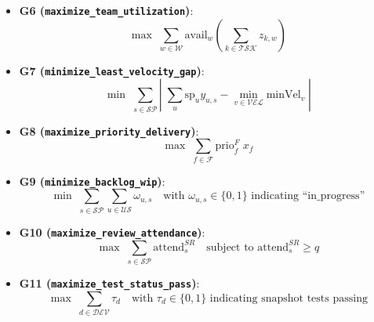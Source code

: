 \documentclass[11pt,a4paper]{article}
\begin{document}
\begin{itemize}[leftmargin=1.2em]
  \item \textbf{G6 (\texttt{maximize\_team\_utilization})}:
  \[
    \max \; \sum_{w \in \mathcal{W}} \mathrm{avail}_w \left(\sum_{k \in \mathcal{TSK}} z_{k,w}\right)
  \]

  \item \textbf{G7 (\texttt{minimize\_least\_velocity\_gap})}:
  \[
    \min \; \sum_{s \in \mathcal{SP}} \left|\; \sum_{u} \mathrm{sp}_u y_{u,s} - \min_{v \in \mathcal{VEL}}\mathrm{minVel}_v \;\right|
  \]

  \item \textbf{G8 (\texttt{maximize\_priority\_delivery})}:
  \[
    \max \; \sum_{f \in \mathcal{F}} \mathrm{prio}^{F}_f \; x_f
  \]

  \item \textbf{G9 (\texttt{minimize\_backlog\_wip})}:
  \[
    \min \; \sum_{s \in \mathcal{SP}} \sum_{u \in \mathcal{US}} \omega_{u,s} \quad \text{with } \omega_{u,s}\in\{0,1\} \text{ indicating ``in\_progress''}
  \]

  \item \textbf{G10 (\texttt{maximize\_review\_attendance})}:
  \[
    \max \; \sum_{s \in \mathcal{SP}} \mathrm{attend}^{SR}_s \quad \text{subject to } \mathrm{attend}^{SR}_s \ge q
  \]

  \item \textbf{G11 (\texttt{maximize\_test\_status\_pass})}:
  \[
    \max \; \sum_{d \in \mathcal{DEV}} \tau_d \quad \text{with } \tau_d \in \{0,1\} \text{ indicating snapshot tests passing}
  \]
\end{itemize}
\end{document}
